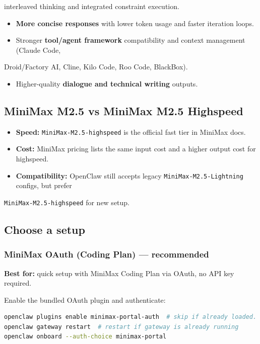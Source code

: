 interleaved thinking and integrated constraint execution.
\begin{itemize}
  \item \textbf{More concise responses} with lower token usage and faster iteration loops.
  \item Stronger \textbf{tool/agent framework} compatibility and context management (Claude Code,
\end{itemize}

Droid/Factory AI, Cline, Kilo Code, Roo Code, BlackBox).
\begin{itemize}
  \item Higher-quality \textbf{dialogue and technical writing} outputs.
\end{itemize}


\subsection{MiniMax M2.5 vs MiniMax M2.5 Highspeed}


\begin{itemize}
  \item \textbf{Speed:} \texttt{MiniMax-M2.5-highspeed} is the official fast tier in MiniMax docs.
  \item \textbf{Cost:} MiniMax pricing lists the same input cost and a higher output cost for highspeed.
  \item \textbf{Compatibility:} OpenClaw still accepts legacy \texttt{MiniMax-M2.5-Lightning} configs, but prefer
\end{itemize}

\texttt{MiniMax-M2.5-highspeed} for new setup.

\subsection{Choose a setup}


\subsubsection{MiniMax OAuth (Coding Plan) — recommended}


\textbf{Best for:} quick setup with MiniMax Coding Plan via OAuth, no API key required.

Enable the bundled OAuth plugin and authenticate:

\begin{lstlisting}[language=bash]
openclaw plugins enable minimax-portal-auth  # skip if already loaded.
openclaw gateway restart  # restart if gateway is already running
openclaw onboard --auth-choice minimax-portal
\end{lstlisting}


